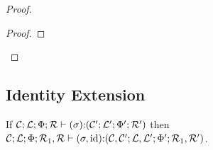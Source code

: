 \documentclass[11pt]{article}%
\begin{document}
\begin{proof}
\begin{proof}
    \end{proof}

\end{proof}

\subsection{Identity Extension}

If $\mathcal{C}  ;  \mathcal{L}  ;  \Phi  ;  \mathcal{R}  \vdash  (  \sigma  )  {:}  (  \mathcal{C}'  ;  \mathcal{L}'  ;  \Phi'  ;  \mathcal{R}'  )$ then $\mathcal{C}  ;  \mathcal{L}  ;  \Phi  ;  \mathcal{R}_{{\mathrm{1}}}  ,  \mathcal{R}  \vdash  (  \sigma  ,   \mathrm{id}   )  {:}  (  \mathcal{C}  ,  \mathcal{C}'  ;  \mathcal{L}  ,  \mathcal{L}'  ;  \Phi'  ;  \mathcal{R}_{{\mathrm{1}}}  ,  \mathcal{R}'  )$.
\end{document}
